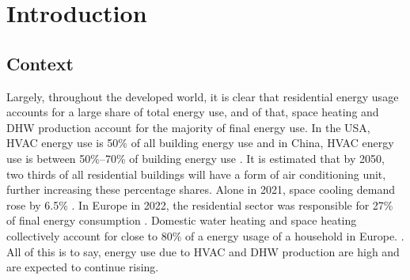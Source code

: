 \chapter{Introduction}\label{ch:intro}



\section{Context}\label{sec:context}

Largely, throughout the developed world, it is clear that residential energy usage accounts for a large share of total energy use, and of that, space heating and \ac{DHW} production account for the majority of final energy use. In the USA, \ac{HVAC} energy use is 50\% of all building energy use and in China, \ac{HVAC} energy use is between 50\%--70\% of building energy use \cite{ieaorg_2018}. It is estimated that by 2050, two thirds of all residential buildings will have a form of air conditioning unit, further increasing these percentage shares. Alone in 2021, space cooling demand rose by 6.5\% \cite{ieaorg_2022}. 
In Europe in 2022, the  residential sector was responsible for 27\% of final energy consumption \cite{eurostat_final_2018}. Domestic water heating and space heating collectively account for close to 80\% of a energy usage of a household in Europe. \cite{eurostat_energy_2020}.
All of this is to say, energy use due to \ac{HVAC} and \ac{DHW} production are high and are expected to continue rising. 

